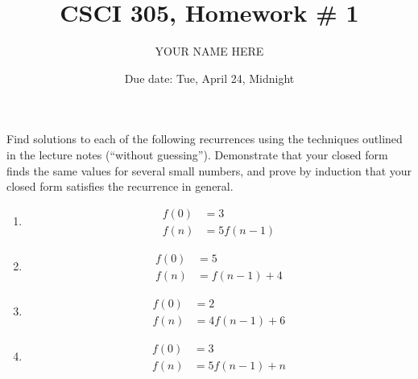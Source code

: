 \documentclass{article}
\title{CSCI 305, Homework \# 1}
\author{YOUR NAME HERE}
\date{Due date: Tue, April 24, Midnight}
\begin{document}
\maketitle

Find solutions to each of the following recurrences
using the techniques outlined in the lecture notes (``without guessing'').
Demonstrate that your closed form finds the same values for several
small numbers, and prove by induction that your closed form satisfies
the recurrence in general.

\begin{enumerate}
\item
  \begin{align*}
    f(0) &= 3\\
    f(n) &= 5f(n-1)
  \end{align*}

\item
  \begin{align*}
    f(0) &= 5\\
    f(n) &= f(n-1) + 4
  \end{align*}

\item
  \begin{align*}
    f(0) &= 2\\
    f(n) &= 4f(n-1) + 6
  \end{align*}

\item
  \begin{align*}
    f(0) &= 3\\
    f(n) &= 5f(n-1) + n
  \end{align*}


\end{enumerate}
\end{document}
